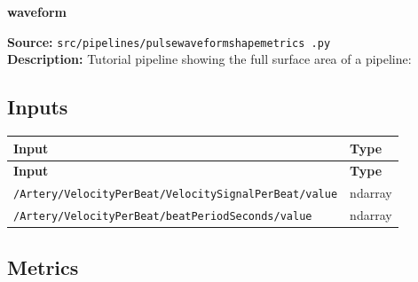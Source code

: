 \documentclass[11pt]{article}
\begin{document}
\begin{center}
\LARGE\textbf{waveform}
\end{center}
\textbf{Source:} \texttt{src/\allowbreak{}pipelines/\allowbreak{}pulsewaveformshapemetrics .py}\\
\textbf{Description:} Tutorial pipeline showing the full surface area of a pipeline:

\subsection*{Inputs}
\begin{longtable}{|p{}|p{}|}
\hline
\textbf{Input} & \textbf{Type} \\ \hline
\endfirsthead
\hline
\textbf{Input} & \textbf{Type} \\ \hline
\endhead
\texttt{/\allowbreak{}Artery/\allowbreak{}VelocityPerBeat/\allowbreak{}VelocitySignalPerBeat/\allowbreak{}value} & ndarray \\ \hline
\texttt{/\allowbreak{}Artery/\allowbreak{}VelocityPerBeat/\allowbreak{}beatPeriodSeconds/\allowbreak{}value} & ndarray \\ \hline
\end{longtable}

\subsection*{Metrics}
\end{document}
